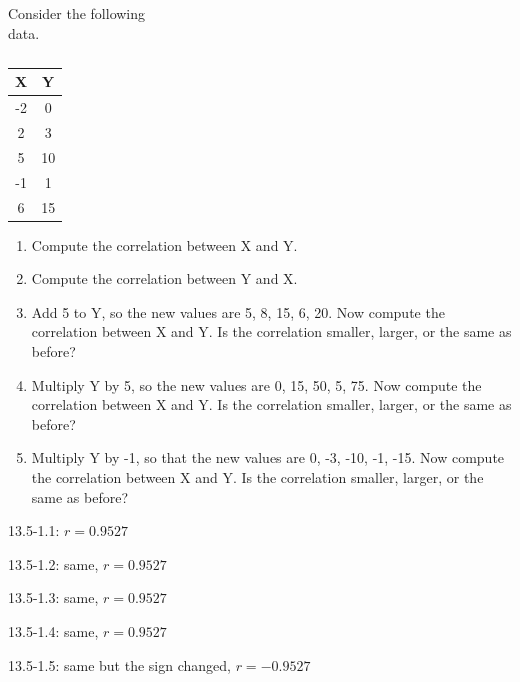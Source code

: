\documentclass[11pt, chapterprefix=true]{scrbook}\usepackage[]{graphicx}\usepackage[]{color}
\begin{document}
\twocolumn

\section{}

\begin{exercises}
\begin{exercise}  %

Consider the following \\ data.
	\begin{table}[ht] 
		\caption{}
		\begin{center}
		\begin{tabular}{c c}
		\textbf{X} & \textbf{Y}\\ \hline
		-2 & 0\\
		2 & 3\\
		5 & 10\\
		-1 & 1\\
		6 & 15\\ \hline
		\end{tabular}
		\end{center}
	\end{table}
	\begin{enumerate}
		\item Compute the correlation between X and Y.
		\item Compute the correlation between Y and X.
		\item Add 5 to Y, so the new values are 5, 8, 15, 6, 20. Now compute the correlation between X and Y. Is the correlation smaller, larger, or the same as before?
		\item Multiply Y by 5, so the new values are 0, 15, 50, 5, 75. Now compute the correlation between X and Y. Is the correlation smaller, larger, or the same as before?
		\item Multiply Y by -1, so that the new values are 0, -3, -10, -1, -15. Now compute the correlation between X and Y. Is the correlation smaller, larger, or the same as before?
	\end{enumerate}
\end{exercise}
\begin{solution}  %



13.5-1.1: $r = 0.9527 $ 

13.5-1.2: same, $r = 0.9527 $ 

13.5-1.3: same, $r = 0.9527 $ 

13.5-1.4: same, $r = 0.9527 $ 

13.5-1.5: same but the sign changed, $r = -0.9527 $ 


\end{solution}
\end{exercises}
\end{document}
